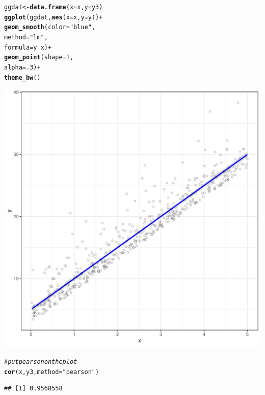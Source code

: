 \documentclass{article}\usepackage[]{graphicx}\usepackage[]{color}
\makeatletter
\def\maxwidth{ %
  \ifdim\Gin@nat@width>\linewidth
    \linewidth
  \else
    \Gin@nat@width
  \fi
}
\newcommand{\hlnum}[1]{\textcolor[rgb]{0.686,0.059,0.569}{#1}}%
\newcommand{\hlstr}[1]{\textcolor[rgb]{0.192,0.494,0.8}{#1}}%
\newcommand{\hlcom}[1]{\textcolor[rgb]{0.678,0.584,0.686}{\textit{#1}}}%
\newcommand{\hlopt}[1]{\textcolor[rgb]{0,0,0}{#1}}%
\newcommand{\hlstd}[1]{\textcolor[rgb]{0.345,0.345,0.345}{#1}}%
\newcommand{\hlkwb}[1]{\textcolor[rgb]{0.69,0.353,0.396}{#1}}%
\newcommand{\hlkwc}[1]{\textcolor[rgb]{0.333,0.667,0.333}{#1}}%
\newcommand{\hlkwd}[1]{\textcolor[rgb]{0.737,0.353,0.396}{\textbf{#1}}}%
\newenvironment{kframe}{%
 \def\at@end@of@kframe{}%
 \ifinner\ifhmode%
  \def\at@end@of@kframe{\end{minipage}}%
  \begin{minipage}{\columnwidth}%
 \fi\fi%
 \def\FrameCommand##1{\hskip\@totalleftmargin \hskip-\fboxsep
 \colorbox{shadecolor}{##1}\hskip-\fboxsep
     \hskip-\linewidth \hskip-\@totalleftmargin \hskip\columnwidth}%
 \MakeFramed {\advance\hsize-\width
   \@totalleftmargin\z@ \linewidth\hsize
   \@setminipage}}%
 {\par\unskip\endMakeFramed%
 \at@end@of@kframe}
\newenvironment{knitrout}{}{} %
\makeatother
\begin{document}
\begin{enumerate}
\begin{enumerate}
\begin{knitrout}
\begin{kframe}
\begin{alltt}
\hlstd{ggdat}\hlkwb{<-}\hlkwd{data.frame}\hlstd{(}\hlkwc{x}\hlstd{=x,} \hlkwc{y}\hlstd{=y3)}
\hlkwd{ggplot}\hlstd{(ggdat,} \hlkwd{aes}\hlstd{(}\hlkwc{x}\hlstd{=x,} \hlkwc{y}\hlstd{=y))}\hlopt{+}
  \hlkwd{geom_smooth}\hlstd{(}\hlkwc{color}\hlstd{=}\hlstr{"blue"}\hlstd{,}
              \hlkwc{method}\hlstd{=}\hlstr{"lm"}\hlstd{,}
              \hlkwc{formula}\hlstd{=y}\hlopt{~}\hlstd{x)}\hlopt{+}
  \hlkwd{geom_point}\hlstd{(}\hlkwc{shape}\hlstd{=}\hlnum{1}\hlstd{,}
             \hlkwc{alpha}\hlstd{=}\hlnum{.3}\hlstd{)}\hlopt{+}
  \hlkwd{theme_bw}\hlstd{()}
\end{alltt}
\end{kframe}
\includegraphics[width=\maxwidth]{figure/unnamed-chunk-16-1} 
\begin{kframe}\begin{alltt}
  \hlcom{#put pearson on the plot}
\hlkwd{cor}\hlstd{(x, y3,} \hlkwc{method}\hlstd{=}\hlstr{"pearson"}\hlstd{)}
\end{alltt}
\begin{verbatim}
## [1] 0.9568558
\end{verbatim}
\end{kframe}
\end{knitrout}


\end{enumerate}
\end{enumerate}
\end{document}
